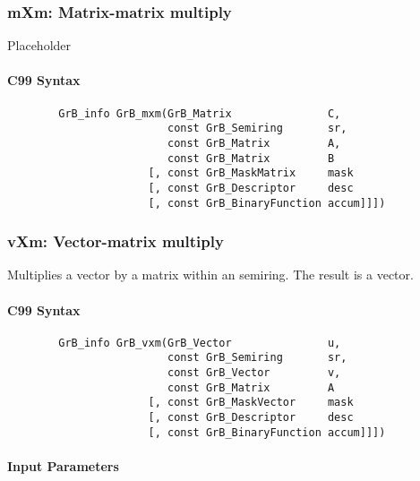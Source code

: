 \subsubsection{{\sf mXm}: Matrix-matrix multiply}

Placeholder


\paragraph{C99 Syntax}

\begin{verbatim}
        GrB_info GrB_mxm(GrB_Matrix               C,
                         const GrB_Semiring       sr,
                         const GrB_Matrix         A, 
                         const GrB_Matrix         B
                      [, const GrB_MaskMatrix     mask
                      [, const GrB_Descriptor     desc
                      [, const GrB_BinaryFunction accum]]])
\end{verbatim}


\subsubsection{{\sf vXm}: Vector-matrix multiply}

Multiplies a vector by a matrix within an semiring. The result is a vector.

\paragraph{C99 Syntax}

\begin{verbatim}
        GrB_info GrB_vxm(GrB_Vector               u,
                         const GrB_Semiring       sr,
                         const GrB_Vector         v, 
                         const GrB_Matrix         A
                      [, const GrB_MaskVector     mask
                      [, const GrB_Descriptor     desc
                      [, const GrB_BinaryFunction accum]]])
\end{verbatim}

\paragraph{Input Parameters}

